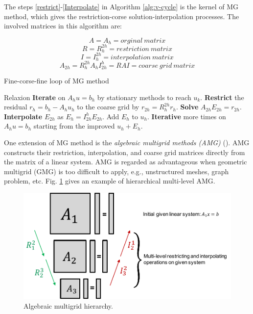 The steps \ref{restrict}-\ref{Interpolate} in Algorithm \ref{alg:v-cycle} is the kernel of MG method, which gives the restriction-corse solution-interpolation processes. The involved matrices in this algorithm are:

\[A=A_h=orginal \ matrix\]
\[R=R_h^{2h}=restriction \ matrix\]
\[I=I_h^{2h}=interpolation \ matrix\]
\[A_{2h}=R_h^{2h}A_hI_{2h}^h=RAI=coarse \ grid \ matrix\]

\begin{algorithm}[htbp]{}
	\caption{Fine-corse-fine loop of MG method}   
	\label{alg:v-cycle}   
	\begin{algorithmic}[1]
		
		\State Relaxion \textbf{Iterate} on $A_hu=b_h$ by stationary methods to reach $u_k$.
		\State \textbf{Restrict} the residual $r_h = b_h - A_hu_h$ to the coarse grid by $r_{2h}=R_h^{2h}r_h$. \label{restrict}
		\State \textbf{Solve} $A_{2h}E_{2h}=r_{2h}$.
		\State \textbf{Interpolate} $E_{2h}$ as $E_h=I^{h}_{2h}E_{2h}$. Add $E_h$ to $u_h$.  \label{Interpolate}
		\State \textbf{Iterative} more times on $A_hu=b_h$ starting from the improved $u_h+E_h$.
		
	\end{algorithmic}  
\end{algorithm}


One extension of MG method is the \textit{algebraic multigrid methods (AMG)} (\cite{ruge1987algebraic, vanvek1996algebraic, brandt1986algebraic,brezina2001algebraic}). AMG constructs their restriction, interpolation, and coarse grid matrices directly from the matrix of a linear system. AMG is regarded as advantageous when geometric multigrid (GMG) is too difficult to apply, e.g., unstructured meshes, graph problem, etc.  Fig. \ref{multilevel-amg} gives an example of hierarchical multi-level AMG.

\begin{figure}[htbp]
	\centering
	\includegraphics[width=0.9\linewidth]{fig/multilevel-amg.pdf}
	\caption{Algebraic multigrid hierarchy.}
	\label{multilevel-amg}
\end{figure}

